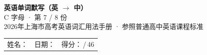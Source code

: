 \documentclass[10pt,a4paper]{article}
\begin{document}
\pagestyle{plain}

\begin{center}
{\LARGE\bfseries 英语单词默写（英 $\to$ 中）}\\[0.22em]
{\large C 字母 · 第 7 / 8 份}\\[0.18em]
{\small 2026年上海市高考英语词汇用法手册 · 参照普通高中英语课程标准}
\end{center}

\vspace{0.25em}
\noindent\begin{tabular}{@{}p{}@{}p{}@{}p{}@{}}
姓名：\underline{\hspace{2.0cm}} & 日期：\underline{\hspace{2.0cm}} & 得分：\underline{\hspace{1.3cm}}\,/\,46 \\
\end{tabular}

\vspace{0.3em}

\vspace{0.08em}
\end{document}

